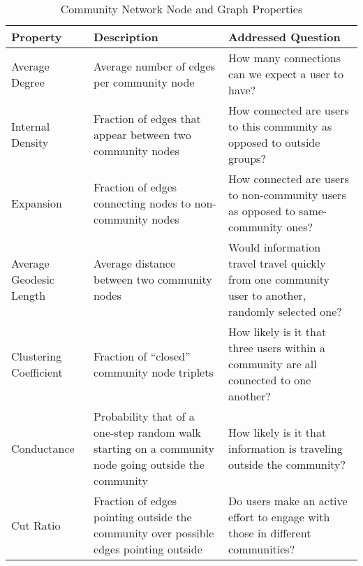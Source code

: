 \documentclass[acmlarge, screen, authorversion]{acmart}
\begin{document}
\begin{table*}

	\caption{Community Network Node and Graph Properties}
	\label{table:graph_properties}

	\begin{tabular}{ p{4cm}  p{4cm}  p{4cm} }

		\toprule
		Property                & Description                                                                                         & Addressed Question                                                                                 \\
		\midrule
		Average Degree          & Average number of edges per community node                                                          & How many connections can we expect a user to have?                                                 \\
		\hline
		Internal Density        & Fraction of edges that appear between two community nodes                                           & How connected are users to this community as opposed to outside groups?                            \\
		\hline
		Expansion               & Fraction of edges connecting nodes to non-community nodes                                           & How connected are users to non-community users as opposed to same-community ones?                  \\
		\hline
		Average Geodesic Length & Average distance between two community nodes                                                        & Would information travel travel quickly from one community user to another, randomly selected one? \\
		\hline
		Clustering Coefficient  & Fraction of ``closed'' community node triplets                                                      & How likely is it that three users within a community are all connected to one another?             \\
		\hline
		Conductance             & Probability that of a one-step random walk starting on a community node going outside the community & How likely is it that information is traveling outside the community?                              \\
		\hline
		Cut Ratio               & Fraction of edges pointing outside the community over possible edges pointing outside               & Do users make an active effort to engage with those in different communities?                      \\
		\bottomrule
	\end{tabular}
\end{table*}
\end{document}
